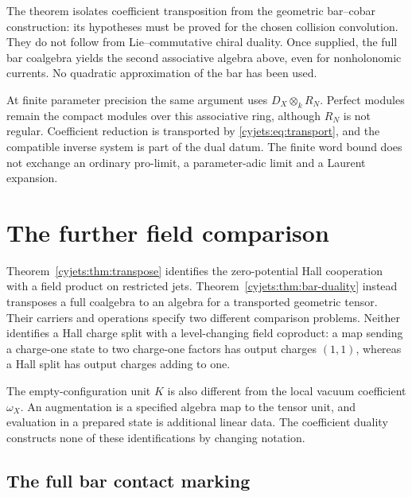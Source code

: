 The theorem isolates coefficient transposition from the geometric
bar--cobar construction: its hypotheses must be proved for the
chosen collision convolution. They do not follow from Lie--commutative
chiral duality. Once supplied, the full bar coalgebra yields the
second associative algebra above, even for nonholonomic currents.
No quadratic approximation of the bar has been used.

At finite parameter precision the same argument uses
$D_X\otimes_kR_N$. Perfect modules remain the compact modules
over this associative ring, although $R_N$ is not regular.
Coefficient reduction is transported by \eqref{cyjets:eq:transport},
and the compatible inverse system is part of the dual datum.
The finite word bound does not exchange an ordinary pro-limit,
a parameter-adic limit and a Laurent expansion.

\section{The further field comparison}
\label{cyjets:sec:comparison}

Theorem~\ref{cyjets:thm:transpose} identifies the zero-potential
Hall cooperation with a field product on restricted jets.
Theorem~\ref{cyjets:thm:bar-duality} instead transposes a full
coalgebra to an algebra for a transported geometric tensor.
Their carriers and operations specify two different comparison
problems. Neither identifies a Hall charge split with a
level-changing field coproduct: a map sending a charge-one state
to two charge-one factors has output charges $(1,1)$, whereas a
Hall split has output charges adding to one.

The empty-configuration unit $K$ is also different from the local
vacuum coefficient $\omega_X$. An augmentation is a specified
algebra map to the tensor unit, and evaluation in a prepared state
is additional linear data. The coefficient duality constructs none
of these identifications by changing notation.

\subsection{The full bar contact marking}


